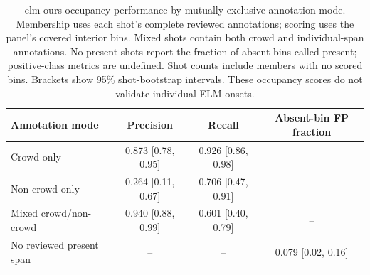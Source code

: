 \begin{table}[t]
\begin{tabular}{lccc}
\toprule
Annotation mode & Precision & Recall & Absent-bin FP fraction \\
\midrule
Crowd only & 0.873 {\scriptsize[0.78, 0.95]} & 0.926 {\scriptsize[0.86, 0.98]} & -- \\
Non-crowd only & 0.264 {\scriptsize[0.11, 0.67]} & 0.706 {\scriptsize[0.47, 0.91]} & -- \\
Mixed crowd/non-crowd & 0.940 {\scriptsize[0.88, 0.99]} & 0.601 {\scriptsize[0.40, 0.79]} & -- \\
No reviewed present span & -- & -- & 0.079 {\scriptsize[0.02, 0.16]} \\
\bottomrule
\end{tabular}\par\medskip\caption{elm-ours occupancy performance by mutually exclusive annotation mode. Membership uses each shot's complete reviewed annotations; scoring uses the panel's covered interior bins. Mixed shots contain both crowd and individual-span annotations. No-present shots report the fraction of absent bins called present; positive-class metrics are undefined. Shot counts include members with no scored bins. Brackets show 95\% shot-bootstrap intervals. These occupancy scores do not validate individual ELM onsets.}
\label{tab:elm-annotation-modes}
\end{table}

